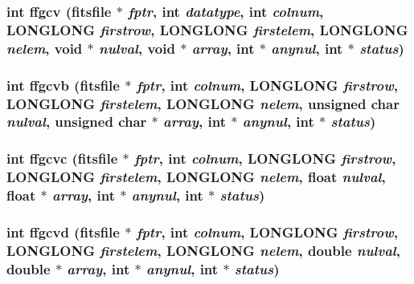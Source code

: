 \subsubsection{\setlength{\rightskip}{0pt plus 5cm}int ffgcv (\bf{fitsfile} $\ast$ {\em fptr}, int {\em datatype}, int {\em colnum}, \bf{LONGLONG} {\em firstrow}, \bf{LONGLONG} {\em firstelem}, \bf{LONGLONG} {\em nelem}, void $\ast$ {\em nulval}, void $\ast$ {\em array}, int $\ast$ {\em anynul}, int $\ast$ {\em status})}\label{fitsio__64_8h_c55e673b8fb566c96679750dab44a150}


\subsubsection{\setlength{\rightskip}{0pt plus 5cm}int ffgcvb (\bf{fitsfile} $\ast$ {\em fptr}, int {\em colnum}, \bf{LONGLONG} {\em firstrow}, \bf{LONGLONG} {\em firstelem}, \bf{LONGLONG} {\em nelem}, unsigned char {\em nulval}, unsigned char $\ast$ {\em array}, int $\ast$ {\em anynul}, int $\ast$ {\em status})}\label{fitsio__64_8h_6520868f56bb9899c89670a38f308ebe}


\subsubsection{\setlength{\rightskip}{0pt plus 5cm}int ffgcvc (\bf{fitsfile} $\ast$ {\em fptr}, int {\em colnum}, \bf{LONGLONG} {\em firstrow}, \bf{LONGLONG} {\em firstelem}, \bf{LONGLONG} {\em nelem}, float {\em nulval}, float $\ast$ {\em array}, int $\ast$ {\em anynul}, int $\ast$ {\em status})}\label{fitsio__64_8h_22ad8e71864412aa1d89aea34a9c57d0}


\subsubsection{\setlength{\rightskip}{0pt plus 5cm}int ffgcvd (\bf{fitsfile} $\ast$ {\em fptr}, int {\em colnum}, \bf{LONGLONG} {\em firstrow}, \bf{LONGLONG} {\em firstelem}, \bf{LONGLONG} {\em nelem}, double {\em nulval}, double $\ast$ {\em array}, int $\ast$ {\em anynul}, int $\ast$ {\em status})}\label{fitsio__64_8h_9318e8aca439f3c12a22b18912423db8}


